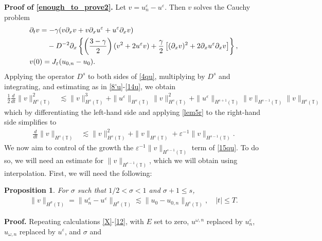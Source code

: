\documentclass[12pt,reqno]{amsart}
\newcommand{\p}{\partial}
\newcommand{\ci}{\mathbb{T}}
\newcommand{\ee}{\varepsilon}
\theoremstyle{plain}  %
\newtheorem{proposition}{Proposition}
\theoremstyle{definition}
\begin{document}
{\bf Proof of \eqref{enough_to_prove2}.} Let $v = u^\ee_n - u^\ee$. Then 
$v$ solves the Cauchy problem
\begin{align}
\label{4qu}
& \p_t v  =  -\gamma (v \p_x v + v \p_x u^\ee + u^\ee \p_x v)  \\
& \phantom{ \p_t v  =} - D^{-2} \p_x \left\{ \left (\frac{3-\gamma}{2} \right )(v^2 +
2u^\ee v) + \frac{\gamma}{2}\left[ (\p_x v)^2 + 2 \p_x u^\ee \p_x v \right]
\right\}, \notag
\\
& v(0) =J_\ee(u_{0,n} - u_0).
\label{5qu}
\end{align}
Applying the operator $D^s$ to both sides of \eqref{4qu}, multiplying by
$D^s$ and integrating, and estimating as in \eqref{8'u}-\eqref{14u}, we 
obtain
%
%
\begin{equation*}
\begin{split}
\frac{1}{2}\frac{d}{dt}\|v\|_{H^{s}(\ci)}^2
& \lesssim \|v\|_{H^s(\ci)}^3 + \|u^\ee\|_{H^s(\ci)}
\|v\|_{H^s(\ci)}^2
 + \|u^\ee\|_{H^{s+1}(\ci)}
\|v\|_{H^{s-1}(\ci)} \|v\|_{H^s(\ci)}
\end{split}
\end{equation*}
%
%
which by differentiating the left-hand side and applying \autoref{lem5r} to 
the right-hand side simplifies to
\begin{equation}
\begin{split}
\frac{d}{dt}\|v\|_{H^{s}(\ci)}
& \lesssim \|v\|_{H^s(\ci)}^2 + \|v\|_{H^s(\ci)}
+ \ee^{-1}
\|v\|_{H^{s-1}(\ci)}.
\label{15qu}
\end{split}
\end{equation}
%
%
We now aim to control of the growth the $\ee^{-1}
\|v\|_{H^{s-1}(\ci)}$ term of \eqref{15qu}. To do so, we will need an estimate for
$\|v\|_{H^{s-1}(\ci)}$, which we will obtain using interpolation. First, 
we will need the following:
%
%
%
%
\begin{proposition}
\label{prop:left}
For $\sigma$ such that $1/2 < \sigma < 1$ and $\sigma + 1 \le s$, 
%
%
\begin{equation}
\label{prop:6rq}
\begin{split}
\|v\|_{H^{\sigma}(\ci)} = \|u^\ee_n - u^\ee\|_{H^\sigma(\ci)}
\lesssim \|u_0 - u_{0,n} \|_{H^s(\ci)}, \quad |t| \le T.
\end{split}
\end{equation}
%
%
\end{proposition}
%
%
%
{\bf Proof.}
Repeating calculations \eqref{X}-\eqref{12}, with $E$ set to zero, 
$u^{\omega,n}$
replaced by $u^\ee_n$, $u_{\omega,n}$ replaced by $u^\ee$, and $\sigma$ and 
\end{document}
